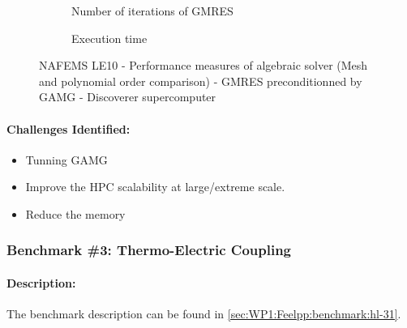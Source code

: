 \begin{figure}
  \begin{subfigure}[c]{\textwidth}
    \centering
    \caption{Number of iterations of GMRES}
  \end{subfigure}
  \begin{subfigure}[c]{\textwidth}
    \centering
    \caption{Execution time}
  \end{subfigure}
  \caption{NAFEMS LE10 - Performance measures of algebraic solver
    (Mesh and polynomial order comparison) - GMRES preconditionned by GAMG - Discoverer supercomputer}
    \label{fig:feelpp:wp3:nafems-le10:performance_measures_all}
\end{figure}


\paragraph{Challenges Identified:} %

\begin{itemize}
\item Tunning GAMG
\item Improve the HPC scalability at large/extreme scale.
\item Reduce the memory
\end{itemize}


\subsubsection{Benchmark \#3: Thermo-Electric Coupling}
\label{sec:WP3:Feelpp:benchmark:hl-31}

\paragraph{Description:} %
The benchmark description can be found in
\cref{sec:WP1:Feelpp:benchmark:hl-31}.

